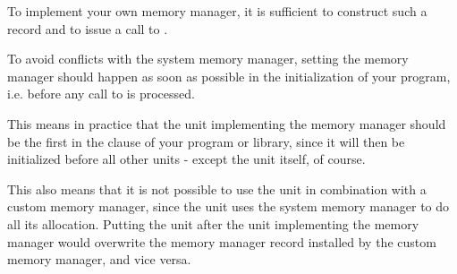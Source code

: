 To implement your own memory manager, it is sufficient to construct such a
record and to issue a call to .

To avoid conflicts with the system memory manager, setting the memory
manager should happen as soon as possible in the initialization of your
program, i.e. before any call to  is processed.

This means in practice that the unit implementing the memory manager should
be the first in the  clause of your program or library, since it
will then be initialized before all other units - except the  unit
itself, of course.

This also means that it is not possible to use the  unit in
combination with a custom memory manager, since the  unit uses
the system memory manager to do all its allocation. Putting the
 unit after the unit implementing the memory manager would
overwrite the memory manager record installed by the custom memory manager,
and vice versa.

